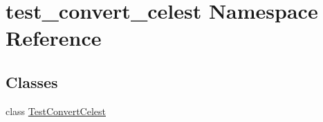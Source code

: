 \hypertarget{namespacetest__convert__celest}{\section{test\-\_\-convert\-\_\-celest Namespace Reference}
\label{namespacetest__convert__celest}
}
\subsection*{Classes}
\begin{DoxyCompactItemize}
\item 
class \hyperlink{classtest__convert__celest_1_1_test_convert_celest}{Test\-Convert\-Celest}
\end{DoxyCompactItemize}
